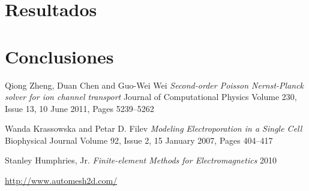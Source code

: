 \documentclass[a4paper,10pt]{article}
\begin{document}

\section{Resultados}

\section{Conclusiones}

\begin{thebibliography}{9}


%
	Qiong Zheng, Duan Chen and Guo-Wei Wei
	\emph{Second-order Poisson Nernst-Planck solver for ion channel transport}
	Journal of Computational Physics
	Volume 230, Issue 13, 10 June 2011, Pages 5239–5262

	Wanda Krassowska and Petar D. Filev
	\emph{Modeling Electroporation in a Single Cell}
	Biophysical Journal
	Volume 92, Issue 2, 15 January 2007, Pages 404–417

	Stanley Humphries, Jr.
	\emph{Finite-element Methods for Electromagnetics}
	2010

%

	\href{http://www.automesh2d.com/}{http://www.automesh2d.com/}

\end{thebibliography}
\end{document}

